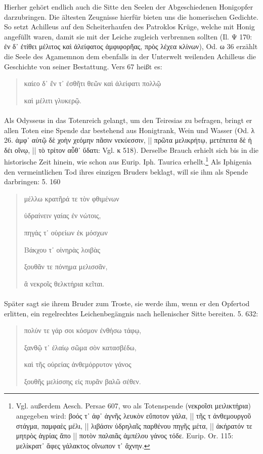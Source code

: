 \documentclass[a4paper, 11pt, oneside]{article}
\begin{document}
Hierher gehört endlich auch die Sitte den Seelen der Abgeschiedenen Honigopfer darzubringen. Die ältesten Zeugnisse hierfür bieten uns die homerischen Gedichte. So setzt Achilleus auf den Scheiterhaufen des Patroklos Krüge, welche mit Honig angefüllt waren, damit sie mit der Leiche zugleich verbrennen sollten (Il. Ψ 170: ἐν δ᾽ ἐτίθει μέλιτος καὶ ἀλείφατος ἀμφιφορῆας, πρὸς λέχεα κλίνων), Od. ω 36 erzählt die Seele des Agamemnon dem ebenfalls in der Unterwelt weilenden Achilleus die Geschichte von seiner Bestattung. Vers 67 heißt es:
\begin{quotation}
καίεο δ᾽ ἔν τ᾿ ἐσθῆτι θεῶν καὶ ἀλείφατι πολλῷ

καὶ μέλιτι γλυκερῷ.
\end{quotation}
\paragraph{}
Als Odysseus in das Totenreich gelangt, um den Teiresias zu befragen, bringt er allen Toten eine Spende dar bestehend aus Honigtrank, Wein und Wasser (Od. λ 26. ἀμφ᾽ αὐτῷ δὲ χοὴν χεόμην πᾶσιν νεκύεσσιν, || πρῶτα μελικρήτῳ, μετέπειτα δὲ ἡ δέι οἴνῳ, || τὸ τρίτον αὖθ᾽ ὕδατι: Vgl. κ 518). Derselbe Brauch erhielt sich bis in die historische Zeit hinein, wie schon aus Eurip. Iph. Taurica erhellt.\footnote{Vgl. außerdem Aesch. Persae 607, wo als Totenspende (νεκροῖσι μειλικτήρια) angegeben wird: βοός τ᾿ ἀφ᾽ ἀγνῆς λευκὸν εὔποτον γάλα, || τῆς τ ἀνθεμουργοῦ στάγμα, παμφαὲς μέλι, || λιβάσιν ὑδρηλαῖς παρθένου πηγῆς μέτα, || ἀκήρατόν τε μητρὸς ἀγρίας ἄπο || ποτὸν παλαιᾶς ἀμπέλου γάνος τόδε. Eurip. Or. 115: μελίκρατ᾽ ἄφες γάλακτος οἴνωπον τ᾽ ἄχνην.} Als Iphigenia den vermeintlichen Tod ihres einzigen Bruders beklagt, will sie ihm als Spende darbringen: 5. 160
\begin{quotation}
μέλλω κρατῆρά τε τὸν φθιμένων

ὑδραίνειν γαίας ἐν νώτοις,

πηγάς τ᾽ οὐρείων ἐκ μόσχων

Βάκχου τ᾽ οἰνηρὰς λοιβὰς

ξουθᾶν τε πόνημα μελισσᾶν,

ἃ νεκροῖς θελκτήρια κεῖται.
\end{quotation}
\paragraph{}
Später sagt sie ihrem Bruder zum Troste, sie werde ihm, wenn er den Opfertod erlitten, ein regelrechtes Leichenbegängnis nach hellenischer Sitte bereiten. 5. 632:
\begin{quotation}
πολύν τε γάρ σοι κόσμον ἐνθήσω τάφῳ,

ξανθῷ τ᾽ ἐλαίῳ σῶμα σὸν κατασβέδω,

καὶ τῆς οὐρείας ἀνθεμόρρυτον γάνος

ξουθῆς μελίσσης εἰς πυρᾶν βαλῶ σέθεν.
\end{quotation}
\end{document}
